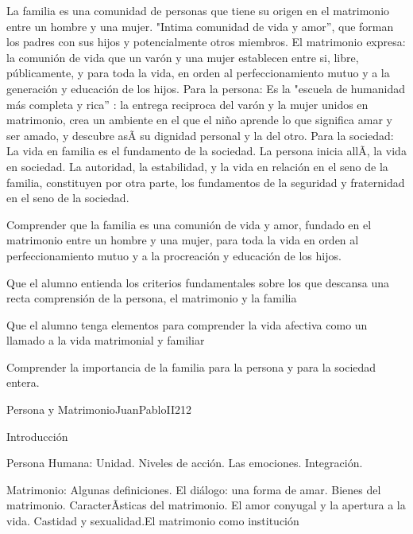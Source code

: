 \begin{syllabus}


\begin{justification}
La familia es una comunidad de personas que tiene su origen en el matrimonio entre un hombre y una mujer. "Intima comunidad de vida y amor'', que forman los padres con sus hijos y potencialmente otros miembros.   El matrimonio expresa: la comunión de vida que un varón y una mujer establecen entre si, libre, públicamente, y para toda la vida, en orden al perfeccionamiento mutuo y a la generación y educación de los hijos. 
Para la persona: Es la "escuela de humanidad más completa y rica'' : la entrega reciproca del varón y la mujer unidos en matrimonio, crea  un ambiente en el que el niño aprende lo que significa amar y ser amado, y descubre asÃ­ su dignidad personal y la del otro. 
Para la sociedad: La vida en familia es el fundamento de la sociedad. La persona inicia allÃ­, la vida en sociedad. La autoridad, la estabilidad, y la vida en relación en el seno de la familia, constituyen por otra parte, los fundamentos de la seguridad y fraternidad en el seno de la sociedad. 
\end{justification}

\begin{goals}
	\item Comprender que la familia es una comunión de vida y amor, fundado en el matrimonio entre un hombre y una mujer, para toda la vida en orden al perfeccionamiento mutuo y a la procreación y educación de los hijos.
	\item Que el alumno entienda los criterios fundamentales sobre los que descansa una recta comprensión de la persona, el matrimonio y la familia
	\item Que el alumno tenga elementos para comprender la vida afectiva como un llamado a la vida matrimonial y familiar
	\item Comprender la importancia de la familia para la persona y para la sociedad entera.
\end{goals}

\begin{outcomes}
\end{outcomes}

\begin{unit}{Persona y Matrimonio}{JuanPabloII}{21}{2}
\begin{topics}
	\item Introducción 
	\item Persona Humana: Unidad. Niveles de acción. Las emociones. Integración. 
	\item Matrimonio: Algunas definiciones. El diálogo: una forma de amar. Bienes del matrimonio. CaracterÃ­sticas del matrimonio. El amor conyugal y la apertura a la vida. Castidad  y sexualidad.El matrimonio como institución  
\end{topics}


\end{unit}
\end{syllabus}
